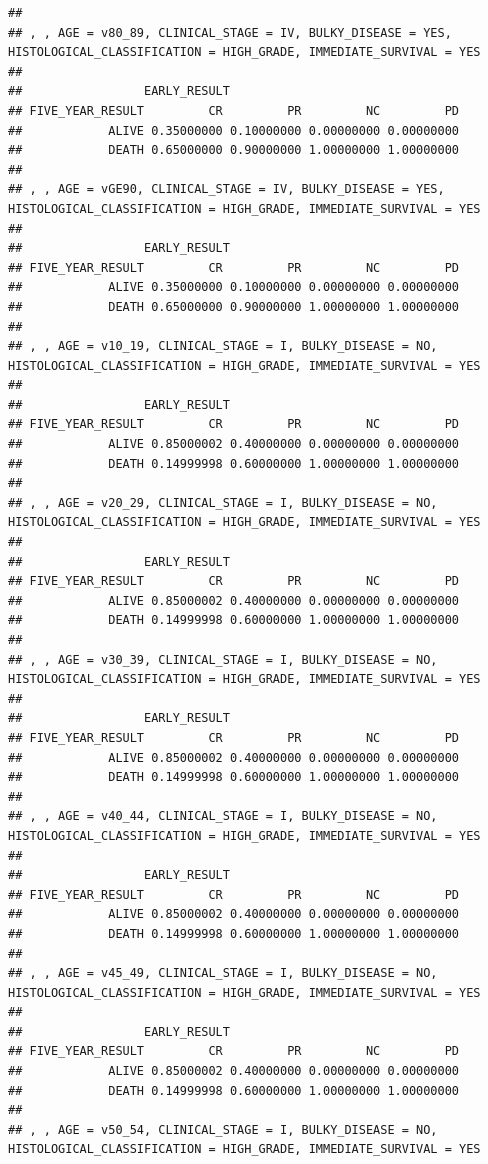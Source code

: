 \documentclass[]{article}
\begin{document}
\begin{verbatim}
## 
## , , AGE = v80_89, CLINICAL_STAGE = IV, BULKY_DISEASE = YES, HISTOLOGICAL_CLASSIFICATION = HIGH_GRADE, IMMEDIATE_SURVIVAL = YES
## 
##                 EARLY_RESULT
## FIVE_YEAR_RESULT         CR         PR         NC         PD
##            ALIVE 0.35000000 0.10000000 0.00000000 0.00000000
##            DEATH 0.65000000 0.90000000 1.00000000 1.00000000
## 
## , , AGE = vGE90, CLINICAL_STAGE = IV, BULKY_DISEASE = YES, HISTOLOGICAL_CLASSIFICATION = HIGH_GRADE, IMMEDIATE_SURVIVAL = YES
## 
##                 EARLY_RESULT
## FIVE_YEAR_RESULT         CR         PR         NC         PD
##            ALIVE 0.35000000 0.10000000 0.00000000 0.00000000
##            DEATH 0.65000000 0.90000000 1.00000000 1.00000000
## 
## , , AGE = v10_19, CLINICAL_STAGE = I, BULKY_DISEASE = NO, HISTOLOGICAL_CLASSIFICATION = HIGH_GRADE, IMMEDIATE_SURVIVAL = YES
## 
##                 EARLY_RESULT
## FIVE_YEAR_RESULT         CR         PR         NC         PD
##            ALIVE 0.85000002 0.40000000 0.00000000 0.00000000
##            DEATH 0.14999998 0.60000000 1.00000000 1.00000000
## 
## , , AGE = v20_29, CLINICAL_STAGE = I, BULKY_DISEASE = NO, HISTOLOGICAL_CLASSIFICATION = HIGH_GRADE, IMMEDIATE_SURVIVAL = YES
## 
##                 EARLY_RESULT
## FIVE_YEAR_RESULT         CR         PR         NC         PD
##            ALIVE 0.85000002 0.40000000 0.00000000 0.00000000
##            DEATH 0.14999998 0.60000000 1.00000000 1.00000000
## 
## , , AGE = v30_39, CLINICAL_STAGE = I, BULKY_DISEASE = NO, HISTOLOGICAL_CLASSIFICATION = HIGH_GRADE, IMMEDIATE_SURVIVAL = YES
## 
##                 EARLY_RESULT
## FIVE_YEAR_RESULT         CR         PR         NC         PD
##            ALIVE 0.85000002 0.40000000 0.00000000 0.00000000
##            DEATH 0.14999998 0.60000000 1.00000000 1.00000000
## 
## , , AGE = v40_44, CLINICAL_STAGE = I, BULKY_DISEASE = NO, HISTOLOGICAL_CLASSIFICATION = HIGH_GRADE, IMMEDIATE_SURVIVAL = YES
## 
##                 EARLY_RESULT
## FIVE_YEAR_RESULT         CR         PR         NC         PD
##            ALIVE 0.85000002 0.40000000 0.00000000 0.00000000
##            DEATH 0.14999998 0.60000000 1.00000000 1.00000000
## 
## , , AGE = v45_49, CLINICAL_STAGE = I, BULKY_DISEASE = NO, HISTOLOGICAL_CLASSIFICATION = HIGH_GRADE, IMMEDIATE_SURVIVAL = YES
## 
##                 EARLY_RESULT
## FIVE_YEAR_RESULT         CR         PR         NC         PD
##            ALIVE 0.85000002 0.40000000 0.00000000 0.00000000
##            DEATH 0.14999998 0.60000000 1.00000000 1.00000000
## 
## , , AGE = v50_54, CLINICAL_STAGE = I, BULKY_DISEASE = NO, HISTOLOGICAL_CLASSIFICATION = HIGH_GRADE, IMMEDIATE_SURVIVAL = YES

\end{verbatim}
\end{document}
